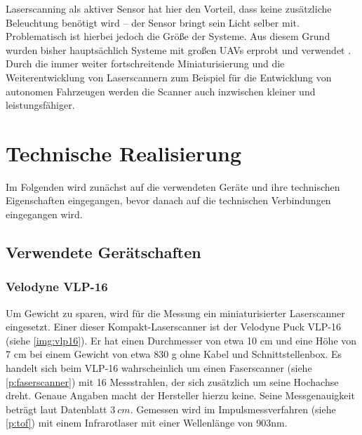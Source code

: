 \documentclass[a4paper,12pt,bibliography=totoc, listof=totoc,titlepage,pointlessnumbers]{scrreprt}
\begin{document}
Laserscanning als aktiver Sensor hat hier den Vorteil, dass keine zusätzliche Beleuchtung benötigt wird -- der Sensor bringt sein Licht selber mit. Problematisch ist hierbei jedoch die Größe der Systeme. Aus diesem Grund wurden bisher hauptsächlich Systeme mit großen UAVs erprobt und verwendet \citep[S. 19]{uav}. Durch die immer weiter fortschreitende Miniaturisierung und die Weiterentwicklung von Laser\-scan\-nern zum Beispiel für die Entwicklung von autonomen Fahrzeugen werden die Scanner auch inzwischen kleiner und leistungsfähiger.


\chapter{Technische Realisierung}
\label{c:realisierung}


Im Folgenden wird zunächst auf die verwendeten Geräte und ihre technischen Eigenschaften eingegangen, bevor danach auf die technischen Verbindungen eingegangen wird.

\section {Verwendete Gerätschaften}

\subsection{Velodyne VLP-16}
\label{sss:vlp16}
Um Gewicht zu sparen, wird für die Messung ein miniaturisierter Laser\-scan\-ner eingesetzt. Einer dieser Kompakt-Laser\-scan\-ner ist der Velodyne Puck VLP-16 (siehe \autoref{img:vlp16}). Er hat einen Durchmesser von etwa 10 cm und eine Höhe von 7 cm bei einem Gewicht von etwa 830 g ohne Kabel und Schnittstellenbox. Es handelt sich beim VLP-16 wahrscheinlich um einen Faserscanner (siehe \autoref{p:faserscanner}) mit 16 Messstrahlen, der sich zusätzlich um seine Hochachse dreht. Genaue Angaben macht der Hersteller hierzu keine. Seine Messgenauigkeit beträgt laut Datenblatt \(3~cm\). Gemessen wird im Impulsmessverfahren (siehe \autoref{p:tof}) mit einem Infrarotlaser mit einer Wellenlänge von 903nm. \citep{vlpSheet}
\end{document}
